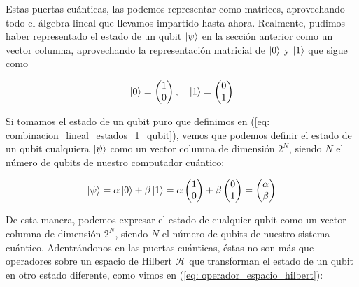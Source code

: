 \documentclass{article}
\numberwithin{equation}{section} %
\begin{document}
    \vspace{5mm}

    Estas puertas cuánticas, las podemos representar como matrices, aprovechando todo el álgebra lineal que llevamos impartido hasta ahora. Realmente, pudimos haber representado el estado de un qubit \( \ket{\psi} \) en la sección anterior como un vector columna, aprovechando la representación matricial de \( \ket{0} \) y \( \ket{1} \) que sigue como

    \begin{equation}
        \ket{0} = \begin{pmatrix}
            1 \\
            0
        \end{pmatrix}
        , \quad \ket{1} = \begin{pmatrix}
            0 \\
            1
        \end{pmatrix}
    \end{equation}

    \vspace{2.5mm}

    Si tomamos el estado de un qubit puro que definimos en (\ref{eq: combinacion_lineal_estados_1_qubit}), vemos que podemos definir el estado de un qubit cualquiera \( \ket{\psi} \) como un vector columna de dimensión \( 2^{N} \), siendo \( N \) el número de qubits de nuestro computador cuántico:

    \begin{equation}
        \ket{\psi} = \alpha \ket{0} + \beta \ket{1} = \alpha \begin{pmatrix}
        1 \\
        0
        \end{pmatrix} + \beta \begin{pmatrix}
        0 \\
        1
        \end{pmatrix} = \begin{pmatrix}
        \alpha \\
        \beta
        \end{pmatrix}
    \end{equation}

    \vspace{2.5mm}

    De esta manera, podemos expresar el estado de cualquier qubit como un vector columna de dimensión \( 2^{N} \), siendo \( N \) el número de qubits de nuestro sistema cuántico. Adentrándonos en las puertas cuánticas, éstas no son más que operadores sobre un espacio de Hilbert \( \mathcal{H} \) que transforman el estado de un qubit en otro estado diferente, como vimos en (\ref{eq: operador_espacio_hilbert}):
\end{document}
